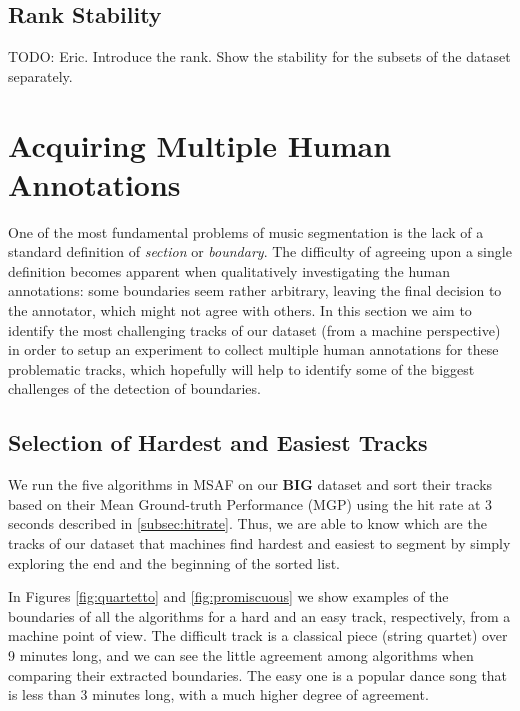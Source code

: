 \documentclass{article}
\begin{document}
\subsection{Rank Stability}

TODO: Eric. Introduce the rank. Show the stability for the subsets of the dataset separately.

\section{Acquiring Multiple Human Annotations}

One of the most fundamental problems of music segmentation is the lack of a standard definition of \textit{section} or \textit{boundary}. 
The difficulty of agreeing upon a single definition becomes apparent when qualitatively investigating the human annotations: some boundaries seem rather arbitrary, leaving the final decision to the annotator, which might not agree with others.
In this section we aim to identify the most challenging tracks of our dataset (from a machine perspective) in order to setup an experiment to collect multiple human annotations for these problematic tracks, which hopefully will help to identify some of the biggest challenges of the detection of boundaries.

\subsection{Selection of Hardest and Easiest Tracks}\label{sub:hard-easy}

We run the five algorithms in MSAF on our \textbf{BIG} dataset and sort their tracks based on their Mean Ground-truth Performance (MGP) using the hit rate at 3 seconds described in \ref{subsec:hitrate}.
Thus, we are able to know which are the tracks of our dataset that machines find hardest and easiest to segment by simply exploring the end and the beginning of the sorted list.

In Figures \ref{fig:quartetto} and \ref{fig:promiscuous} we show examples of the boundaries of all the algorithms for a hard and an easy track, respectively, from a machine point of view.
The difficult track is a classical piece (string quartet) over 9 minutes long, and we can see the little agreement among algorithms when comparing their extracted boundaries.
The easy one is a popular dance song that is less than 3 minutes long, with a much higher degree of agreement.
\end{document}
